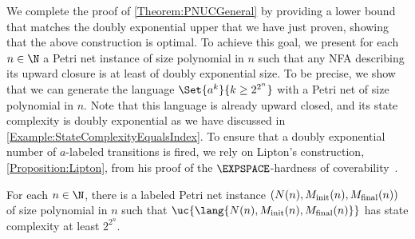 \documentclass[../../diss.tex]{subfiles}
\begin{document}
We complete the proof of \cref{Theorem:PNUCGeneral} by providing a lower bound that matches the doubly exponential upper that we have just proven, showing that the above construction is optimal.
To achieve this goal, we present for each $n \in \N$ a Petri net instance of size polynomial in $n$ such that any NFA describing its upward closure is at least of doubly exponential size.
To be precise, we show that we can generate the language $\Set{ a^k}{k \geq 2^{2^n}}$ with a Petri net of size polynomial in $n$.
Note that this language is already upward closed, and its state complexity is doubly exponential as we have discussed in \cref{Example:StateComplexityEqualsIndex}.
To ensure that a doubly exponential number of $a$-labeled transitions is fired, we rely on Lipton's construction, \cref{Proposition:Lipton}, from his proof of the $\EXPSPACE$-hardness of coverability~\cite{Lipton76}.

\begin{proposition}%
\label{Proposition:PNUCLowerBound}%
    For each $n \in \N$, there is a labeled Petri net instance $(N(n), M_{\text{init}}(n), M_{\text{final}}(n))$ of size polynomial in $n$ such that $\uc{\lang{N(n), \Minit(n), \Mfinal(n)}}$ has state complexity at least $2^{2^n}$.
\end{proposition}
\end{document}
